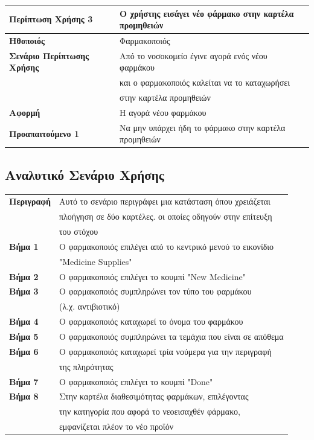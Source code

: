 \documentclass{article}
\newcommand\T{\rule{0pt}{2.6ex}}       %
\newcommand\B{\rule[-1.2ex]{0pt}{0pt}}
\begin{document}
\begin{center}
     \begin{tabular}{|l|l|}
     \hline
      \textbf{Περίπτωση Χρήσης 3} & Ο χρήστης εισάγει νέο φάρμακο στην καρτέλα προμηθειών \T\B \\ 
      \hline
      \textbf{Ηθοποιός} & Φαρμακοποιός \T\B \\
      \hline
      \textbf{Σενάριο Περίπτωσης Χρήσης} & Από το νοσοκομείο έγινε αγορά ενός νέου φαρμάκου \T \\& και ο φαρμακοποιός καλείται να το καταχωρήσει \\& στην καρτέλα προμηθειών \B \\
      \hline
      \textbf{Αφορμή} & Η αγορά νέου φαρμάκου \T\B \\
      \hline
      \textbf{Προαπαιτούμενο 1} &  Να μην υπάρχει ήδη το φάρμακο στην καρτέλα προμηθειών \T\B \\
      \hline
     \end{tabular}
 \end{center}
 
 \subsection{Αναλυτικό Σενάριο Χρήσης}
 
 \begin{center}
     \begin{tabular}{|l|l|}
     \hline
      \textbf{Περιγραφή} & Αυτό το σενάριο περιγράφει μια κατάσταση όπου χρειάζεται \T \\& πλοήγηση σε δύο καρτέλες. οι οποίες οδηγούν στην επίτευξη \\& του στόχου  \B \\ 
      \hline
      \textbf{Βήμα 1} & Ο φαρμακοποιός επιλέγει από το κεντρικό μενού το εικονίδιο \T \\&  "Medicine Supplies" \B \\
      \hline
      \textbf{Βήμα 2} & Ο φαρμακοποιός επιλέγει το κουμπί "New Medicine" \T\B \\
      \hline
      \textbf{Βήμα 3} & Ο φαρμακοποιός συμπληρώνει τον τύπο του φαρμάκου \T \\& (λ.χ. αντιβιοτικό) \B \\
      \hline
      \textbf{Βήμα 4} & Ο φαρμακοποιός καταχωρεί το όνομα του φαρμάκου \T\B \\
      \hline
      \textbf{Βήμα 5} & Ο φαρμακοποιός συμπληρώνει τα τεμάχια που είναι σε απόθεμα \T\B \\
      \hline
      \textbf{Βήμα 6} & Ο φαρμακοποιός καταχωρεί τρία νούμερα για την περιγραφή \T \\&  της πληρότητας \B \\
      \hline
      \textbf{Βήμα 7} & Ο φαρμακοποιός επιλέγει το κουμπί "Done" \T\B \\
      \hline
      \textbf{Βήμα 8} & Στην καρτέλα διαθεσιμότητας φαρμάκων, επιλέγοντας \T \\ & την κατηγορία που αφορά το νεοεισαχθέν φάρμακο, \\& εμφανίζεται πλέον το νέο προϊόν \B \\
      \hline
     \end{tabular}
 \end{center}
\end{document}
